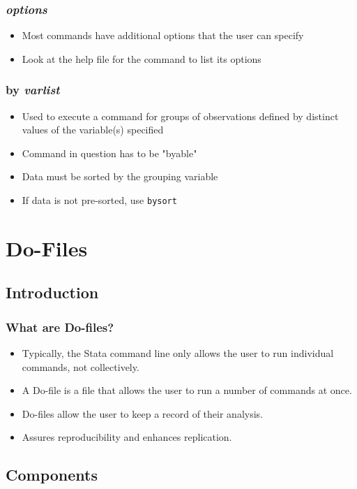 \documentclass{beamer}
\begin{document}
\begin{frame}
	\frametitle{\textit{options}}
		\begin{itemize}
			\item Most commands have additional options that the user can specify
			\item Look at the help file for the command to list its options
		\end{itemize}
\end{frame}

\begin{frame}
	\frametitle{by \textit{varlist}}
		\begin{itemize}
			\item Used to execute a command for groups of observations defined by distinct values of the variable(s) specified
			\item Command in question has to be "byable"
			\item Data must be sorted by the grouping variable
			\item If data is not pre-sorted, use \texttt{bysort}
		\end{itemize}
\end{frame}

\section{Do-Files}

\subsection{Introduction}

\begin{frame}
	\frametitle{What are Do-files?}
		\begin{itemize}
			\item Typically, the Stata command line only allows the user to run individual commands, not collectively.
			\item A Do-file is a file that allows the user to run a number of commands at once.
			\item Do-files allow the user to keep a record of their analysis.
			\item Assures reproducibility and enhances replication.
		\end{itemize}
\end{frame}

\subsection{Components}
\end{document}
